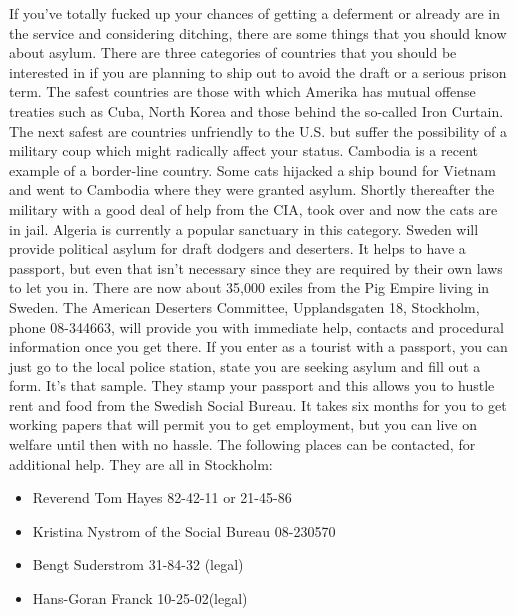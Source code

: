 \documentclass[11pt,twoside,a4paper]{book}
\begin{document}
If you've totally fucked up your chances of getting a deferment or already are in the service and considering ditching, there are some things that you should know about asylum. There are three categories of countries that you should be interested in if you are planning to ship out to avoid the draft or a serious prison term. The safest countries are those with which Amerika has mutual offense treaties such as Cuba, North Korea and those behind the so-called Iron Curtain. The next safest are countries unfriendly to the U.S. but suffer the possibility of a military coup which might radically affect your status. Cambodia is a recent example of a border-line country. Some cats hijacked a ship bound for Vietnam and went to Cambodia where they were granted asylum. Shortly thereafter the military with a good deal of help from the CIA, took over and now the cats are in jail. Algeria is currently a popular sanctuary in this category. Sweden will provide political asylum for draft dodgers and deserters. It helps to have a passport, but even that isn't necessary since they are required by their own laws to let you in. There are now about 35,000 exiles from the Pig Empire living in Sweden. The American Deserters Committee, Upplandsgaten 18, Stockholm, phone 08-344663, will provide you with immediate help, contacts and procedural information once you get there. If you enter as a tourist with a passport, you can just go to the local police station, state you are seeking asylum and fill out a form. It's that sample. They stamp your passport and this allows you to hustle rent and food from the Swedish Social Bureau. It takes six months for you to get working papers that will permit you to get employment, but you can live on welfare until then with no hassle. The following places can be contacted, for additional help. They are all in Stockholm: 
\begin{itemize}
\item Reverend Tom Hayes 82-42-11 or 21-45-86 
\item Kristina Nystrom of the Social Bureau 08-230570 
\item Bengt Suderstrom 31-84-32 (legal)
\item Hans-Goran Franck 10-25-02(legal)
\end{itemize}
\end{document}
